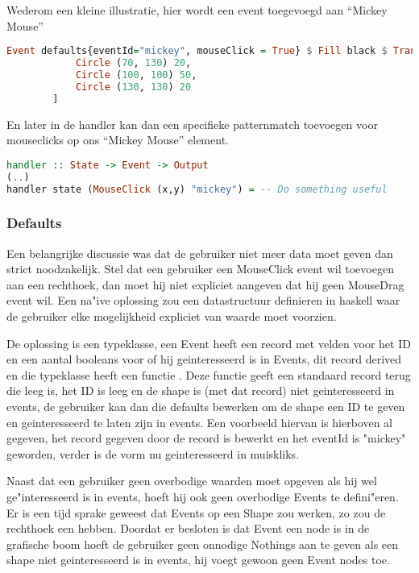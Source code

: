 Wederom een kleine illustratie, hier wordt een event toegevoegd aan ``Mickey Mouse''

\begin{lstlisting}[style=densecode, language=Haskell]
Event defaults{eventId="mickey", mouseClick = True} $ Fill black $ Translate 100 100 $ Rotate 90 $ Container 200 200 [
            Circle (70, 130) 20,
            Circle (100, 100) 50,
            Circle (130, 130) 20
        ]
\end{lstlisting}

En later in de handler kan dan een specifieke patternmatch toevoegen voor mouseclicks op ons ``Mickey Mouse'' element.
\begin{lstlisting}[style=densecode, language=Haskell]
handler :: State -> Event -> Output
(..)
handler state (MouseClick (x,y) "mickey") = -- Do something useful
\end{lstlisting}

\subsubsection{Defaults}
Een belangrijke discussie was dat de gebruiker niet meer data moet geven dan strict noodzakelijk. Stel dat een gebruiker een MouseClick event wil toevoegen aan een rechthoek, dan moet hij niet expliciet aangeven dat hij geen MouseDrag event wil. Een na"ive oplossing zou een datastructuur definieren in haskell waar de gebruiker elke mogelijkheid expliciet van waarde moet voorzien.

De oplossing is een  typeklasse, een Event heeft een record met velden voor het ID en een aantal booleans voor of hij geinteresseerd is in Events, dit record derived  en die typeklasse heeft een functie . Deze functie geeft een standaard record terug die leeg is, het ID is leeg en de shape is (met dat record) niet geinteresseerd in events, de gebruiker kan dan die defaults bewerken om de shape een ID te geven en geinteresseerd te laten zijn in events. Een voorbeeld hiervan is hierboven al gegeven, het record gegeven door de  record is bewerkt en het eventId is "mickey" geworden, verder is de vorm nu geinteresseerd in muiskliks.

Naast dat een gebruiker geen overbodige waarden moet opgeven als hij wel ge"interesseerd is in events, hoeft hij ook geen overbodige Events te defini"eren. Er is een tijd sprake geweest dat Events op een Shape zou werken, zo zou de rechthoek een  hebben. Doordat er besloten is dat Event een node is in de grafische boom hoeft de gebruiker geen onnodige Nothings aan te geven als een shape niet geinteresseerd is in events, hij voegt gewoon geen Event nodes toe.

